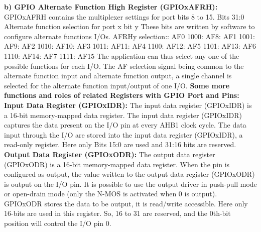 \documentclass{article}
\begin{document}
\textbf{b) GPIO Alternate Function High Register (GPIOx\textunderscore AFRH):} GPIOx\textunderscore AFRH contains the multiplexer settings for port bits 8 to 15.\newline\newline
Bits 31:0 Alternate function selection for port x bit y\newline\newline
These bits are written by software to configure alternate functions I/Os. AFRHy selection:\newline{}: AF0 1000: AF8\newline{}: AF1 1001: AF9\newline{}: AF2 1010: AF10\newline{}: AF3 1011: AF11\newline{}: AF4 1100: AF12\newline{}: AF5 1101: AF13\newline{}: AF6 1110: AF14\newline{}: AF7 1111: AF15\newline\newline
The application can thus select any one of the possible functions for each I/O. The AF selection signal being common to the alternate function input and alternate function output, a single channel is selected for the alternate function input/output of one I/O.\newline\newline
\textbf{Some more functions and roles of related Registers with GPIO Port and Pins:\newline\newline}
\textbf{Input Data Register (GPIOx\textunderscore IDR): } The input data register (GPIOx\textunderscore IDR) is a 16-bit memory-mapped data register. The input data register (GPIOx\textunderscore IDR) captures the data present on the I/O pin at every AHB1 clock cycle. The data input through the I/O are stored into the input data register (GPIOx\textunderscore IDR), a read-only register. Here only Bits 15:0 are used and 31:16 bits are reserved.\newline\newline
\textbf{Output Data Register (GPIOx\textunderscore ODR): }
The output data register (GPIOx\textunderscore ODR) is a 16-bit memory-mapped data register. When the pin is configured as output, the value written to the output data register (GPIOx\textunderscore ODR) is output on the I/O pin. It is possible to use the output driver in push-pull mode or open-drain mode (only the N-MOS is activated when 0 is output). GPIOx\textunderscore ODR stores the data to be output, it is read/write accessible. Here only 16-bits are used in this register. So, 16 to 31 are reserved, and the 0th-bit position will control the I/O pin 0.\newline\newline
\end{document}
